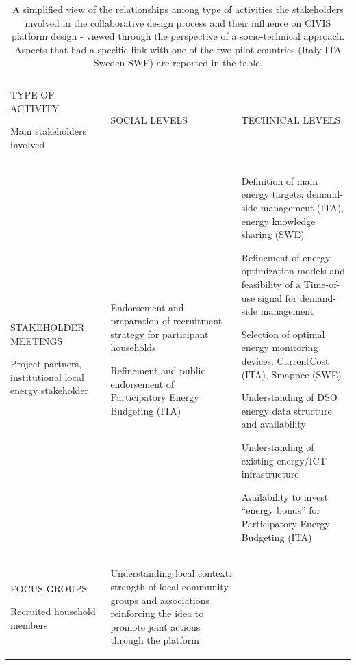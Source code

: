 \begin{table}
\vspace*{10cm} 
\label{tab:activities}  
\caption{A simplified view of the relationships among type of activities the stakeholders involved in the collaborative design process and their influence on CIVIS platform design - viewed through the perspective of a socio-technical approach. Aspects that had a specific link with one of the two pilot countries (Italy ITA Sweden SWE) are reported in the table.}
\begin{tabular}{>{\centering\arraybackslash}m{5.5cm}>{\centering\arraybackslash}m{6.5cm}>{\centering\arraybackslash}m{6.5cm}}
\hline\noalign{\smallskip}
TYPE OF ACTIVITY\par Main stakeholders involved   & SOCIAL LEVELS & TECHNICAL LEVELS  \\
\noalign{\smallskip}\svhline\noalign{\smallskip}
STAKEHOLDER MEETINGS \par
Project partners, institutional local energy stakeholder
&   \begin{compactitem}
	\item Endorsement and preparation of recruitment strategy for participant households
	\item Refinement and public endorsement of Participatory Energy Budgeting (ITA)
\end{compactitem} 
&  \begin{compactitem}
	\item Definition of main energy targets: demand-side management (ITA), energy knowledge sharing (SWE)
	\item	Refinement of energy optimization models and feasibility of a Time-of-use signal for demand-side management
	\item 	Selection of optimal energy monitoring devices: CurrentCost (ITA), Smappee (SWE)
	\item 	Understanding of DSO energy data structure and availability
	\item 	Understanding of existing energy/ICT infrastructure
	\item 	Availability to invest ``energy bonus'' for Participatory Energy Budgeting  (ITA)
\end{compactitem} \\
  \hline\noalign{\smallskip}
FOCUS GROUPS \par
Recruited household members 
&  \begin{compactitem}
 	\item Understanding local context: strength of local community groups and associations reinforcing the idea to promote joint actions through the platform 

\end{compactitem}
\end{tabular}
\end{table}
